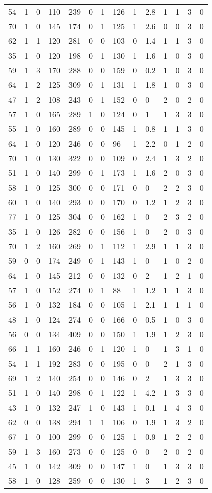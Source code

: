 \documentclass{article}
\begin{document}
\begin{longtable}{|l|l|l|l|l|l|l|l|l|l|l|l|l|l|}
54&1&0&110&239&0&1&126&1&2.8&1&1&3&0 \\ 
70&1&0&145&174&0&1&125&1&2.6&0&0&3&0 \\ 
62&1&1&120&281&0&0&103&0&1.4&1&1&3&0 \\ 
35&1&0&120&198&0&1&130&1&1.6&1&0&3&0 \\ 
59&1&3&170&288&0&0&159&0&0.2&1&0&3&0 \\ 
64&1&2&125&309&0&1&131&1&1.8&1&0&3&0 \\ 
47&1&2&108&243&0&1&152&0&0&2&0&2&0 \\ 
57&1&0&165&289&1&0&124&0&1&1&3&3&0 \\ 
55&1&0&160&289&0&0&145&1&0.8&1&1&3&0 \\ 
64&1&0&120&246&0&0&96&1&2.2&0&1&2&0 \\ 
70&1&0&130&322&0&0&109&0&2.4&1&3&2&0 \\ 
51&1&0&140&299&0&1&173&1&1.6&2&0&3&0 \\ 
58&1&0&125&300&0&0&171&0&0&2&2&3&0 \\ 
60&1&0&140&293&0&0&170&0&1.2&1&2&3&0 \\ 
77&1&0&125&304&0&0&162&1&0&2&3&2&0 \\ 
35&1&0&126&282&0&0&156&1&0&2&0&3&0 \\ 
70&1&2&160&269&0&1&112&1&2.9&1&1&3&0 \\ 
59&0&0&174&249&0&1&143&1&0&1&0&2&0 \\ 
64&1&0&145&212&0&0&132&0&2&1&2&1&0 \\ 
57&1&0&152&274&0&1&88&1&1.2&1&1&3&0 \\ 
56&1&0&132&184&0&0&105&1&2.1&1&1&1&0 \\ 
48&1&0&124&274&0&0&166&0&0.5&1&0&3&0 \\ 
56&0&0&134&409&0&0&150&1&1.9&1&2&3&0 \\ 
66&1&1&160&246&0&1&120&1&0&1&3&1&0 \\ 
54&1&1&192&283&0&0&195&0&0&2&1&3&0 \\ 
69&1&2&140&254&0&0&146&0&2&1&3&3&0 \\ 
51&1&0&140&298&0&1&122&1&4.2&1&3&3&0 \\ 
43&1&0&132&247&1&0&143&1&0.1&1&4&3&0 \\ 
62&0&0&138&294&1&1&106&0&1.9&1&3&2&0 \\ 
67&1&0&100&299&0&0&125&1&0.9&1&2&2&0 \\ 
59&1&3&160&273&0&0&125&0&0&2&0&2&0 \\ 
45&1&0&142&309&0&0&147&1&0&1&3&3&0 \\ 
58&1&0&128&259&0&0&130&1&3&1&2&3&0 \\ 

\end{longtable}
\end{document}
